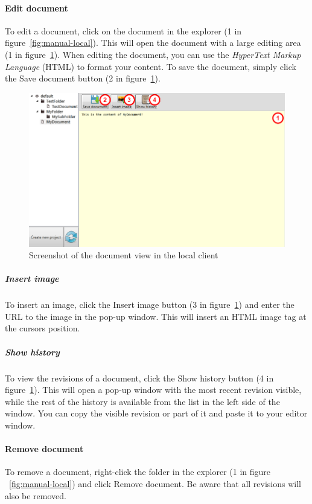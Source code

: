	\paragraph{Edit document}
	To edit a document, click on the document in the explorer (1 in figure~\ref{fig:manual-local}). This will open the document with a large editing area (1 in figure~\ref{fig:manual-local-document}). When editing the document, you can use the \emph{HyperText Markup Language}\cite{w3cHTML} (HTML) to format your content. To save the document, simply click the Save document button (2 in figure~\ref{fig:manual-local-document}).
	
	\begin{figure}[htb]
		\centering
		\includegraphics[width=1\textwidth]{User_manual/graphics/local-document.png}
		\caption{Screenshot of the document view in the local client}
		\label{fig:manual-local-document}
	\end{figure}
	
		\subparagraph{Insert image}
		To insert an image, click the Insert image button (3 in figure~\ref{fig:manual-local-document}) and enter the URL to the image in the pop-up window. This will insert an HTML image tag at the cursors position.
		
		\subparagraph{Show history}
		To view the revisions of a document, click the Show history button (4 in figure~\ref{fig:manual-local-document}). This will open a pop-up window with the most recent revision visible, while the rest of the history is available from the list in the left side of the window. You can copy the visible revision or part of it and paste it to your editor window.
	
	\paragraph{Remove document}
	To remove a document, right-click the folder in the explorer (1 in figure ~\ref{fig:manual-local}) and click Remove document. Be aware that all revisions will also be removed.

